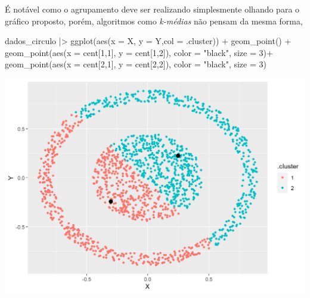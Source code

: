 \documentclass[
  letterpaper,
  DIV=11,
  numbers=noendperiod]{scrreprt}
\newenvironment{Shaded}{\begin{snugshade}}{\end{snugshade}}
\newcommand{\AttributeTok}[1]{\textcolor[rgb]{0.40,0.45,0.13}{#1}}
\newcommand{\DecValTok}[1]{\textcolor[rgb]{0.68,0.00,0.00}{#1}}
\newcommand{\FunctionTok}[1]{\textcolor[rgb]{0.28,0.35,0.67}{#1}}
\newcommand{\NormalTok}[1]{\textcolor[rgb]{0.00,0.23,0.31}{#1}}
\newcommand{\OtherTok}[1]{\textcolor[rgb]{0.00,0.23,0.31}{#1}}
\newcommand{\SpecialCharTok}[1]{\textcolor[rgb]{0.37,0.37,0.37}{#1}}
\newcommand{\StringTok}[1]{\textcolor[rgb]{0.13,0.47,0.30}{#1}}
\begin{document}
É notável como o agrupamento deve ser realizando simplesmente olhando
para o gráfico proposto, porém, algoritmos como \emph{k-médias} não
pensam da mesma forma,

\begin{Shaded}
\end{Shaded}

\begin{Shaded}
\begin{Highlighting}[]
\NormalTok{dados\_circulo }\SpecialCharTok{|\textgreater{}} 
  \FunctionTok{ggplot}\NormalTok{(}\FunctionTok{aes}\NormalTok{(}\AttributeTok{x =}\NormalTok{ X, }\AttributeTok{y =}\NormalTok{ Y,}\AttributeTok{col =}\NormalTok{ .cluster)) }\SpecialCharTok{+}
  \FunctionTok{geom\_point}\NormalTok{() }\SpecialCharTok{+}
  \FunctionTok{geom\_point}\NormalTok{(}\FunctionTok{aes}\NormalTok{(}\AttributeTok{x =}\NormalTok{ cent[}\DecValTok{1}\NormalTok{,}\DecValTok{1}\NormalTok{], }\AttributeTok{y =}\NormalTok{ cent[}\DecValTok{1}\NormalTok{,}\DecValTok{2}\NormalTok{]), }\AttributeTok{color =} \StringTok{"black"}\NormalTok{, }\AttributeTok{size =} \DecValTok{3}\NormalTok{)}\SpecialCharTok{+}
  \FunctionTok{geom\_point}\NormalTok{(}\FunctionTok{aes}\NormalTok{(}\AttributeTok{x =}\NormalTok{ cent[}\DecValTok{2}\NormalTok{,}\DecValTok{1}\NormalTok{], }\AttributeTok{y =}\NormalTok{ cent[}\DecValTok{2}\NormalTok{,}\DecValTok{2}\NormalTok{]), }\AttributeTok{color =} \StringTok{"black"}\NormalTok{, }\AttributeTok{size =} \DecValTok{3}\NormalTok{)}
\end{Highlighting}
\end{Shaded}

\includegraphics{./figuras_naosupervisionado/unnamed-chunk-19-1.png}
\end{document}
